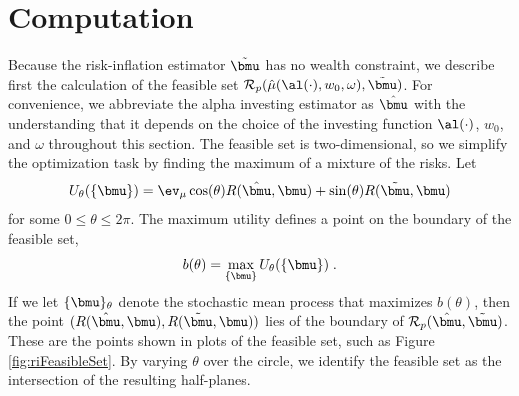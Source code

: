 \documentclass[12pt]{article}
\begin{document}





\section{ Computation }


  Because the risk-inflation estimator $\tilde{\bmu}$ has no wealth constraint,
 we describe first the calculation of the feasible set ${\cal R}_p(\hat\mu(
 \al(\cdot), w_0, \omega), \tilde{\bmu})$.  For convenience, we abbreviate the
 alpha investing estimator as $\hat{\bmu}$ with the understanding that it
 depends on the choice of the investing function $\al(\cdot)$, $w_0$, and
 $\omega$ throughout this section.  The feasible set is two-dimensional, so we
 simplify the optimization task by finding the maximum of a mixture of the
 risks.  Let
 \begin{equation}
   U_\theta(\{\bmu\}) = \ev_\mu 
       \cos(\theta) R(\hat{\bmu}, \bmu) + \sin(\theta) R(\tilde{\bmu},\bmu) 
 \label{eq:bTheta}
 \end{equation}
 for some $ 0 \le \theta \le 2 \pi$.  The maximum utility defines a point on the
boundary of the feasible set,
 \begin{equation}
   b(\theta) = \max_{\{\bmu\}} U_\theta(\{\bmu\})  \;.
 \label{eq:bTheta}
 \end{equation}
 If we let $\{\bmu\}_\theta$ denote the stochastic mean process that maximizes
 $b(\theta)$, then the point $(R(\hat{\bmu}, \bmu), R(\tilde{\bmu}, \bmu))$ lies
 of the boundary of ${\cal R}_p(\hat{\bmu},\tilde{\bmu})$.  These are the points
 shown in plots of the feasible set, such as Figure \ref{fig:riFeasibleSet}.  By
 varying $\theta$ over the circle, we identify the feasible set as the
 intersection of the resulting half-planes.
\end{document}
